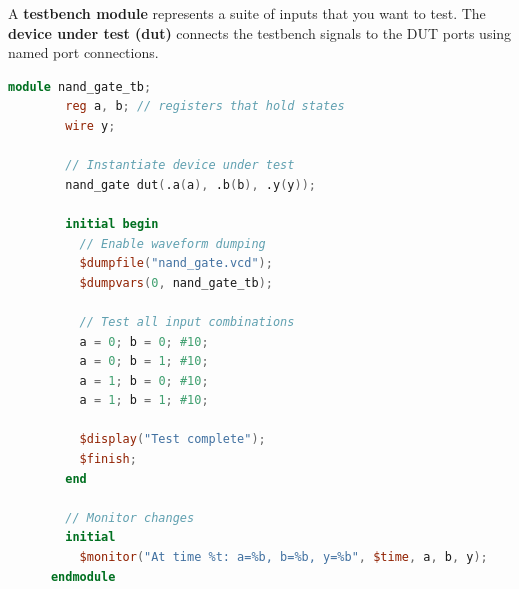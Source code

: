   \begin{definition}
    A \textbf{testbench module} represents a suite of inputs that you want to test. The \textbf{device under test (dut)} connects the testbench signals to the DUT ports using named port connections. 

    \begin{lstlisting}[language=Verilog]
      module nand_gate_tb;
        reg a, b; // registers that hold states
        wire y;

        // Instantiate device under test
        nand_gate dut(.a(a), .b(b), .y(y));

        initial begin
          // Enable waveform dumping
          $dumpfile("nand_gate.vcd");
          $dumpvars(0, nand_gate_tb);

          // Test all input combinations
          a = 0; b = 0; #10;
          a = 0; b = 1; #10;
          a = 1; b = 0; #10;
          a = 1; b = 1; #10;

          $display("Test complete");
          $finish;
        end

        // Monitor changes
        initial
          $monitor("At time %t: a=%b, b=%b, y=%b", $time, a, b, y);
      endmodule
    \end{lstlisting}
  \end{definition}

